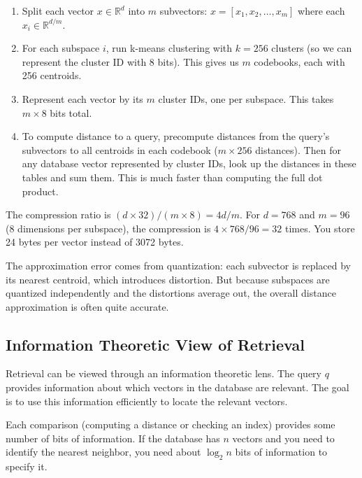 \begin{enumerate}
\item Split each vector $x \in \mathbb{R}^d$ into $m$ subvectors: $x = [x_1, x_2, \ldots, x_m]$ where each $x_i \in \mathbb{R}^{d/m}$.

\item For each subspace $i$, run k-means clustering with $k = 256$ clusters (so we can represent the cluster ID with 8 bits). This gives us $m$ codebooks, each with 256 centroids.

\item Represent each vector by its $m$ cluster IDs, one per subspace. This takes $m \times 8$ bits total.

\item To compute distance to a query, precompute distances from the query's subvectors to all centroids in each codebook ($m \times 256$ distances). Then for any database vector represented by cluster IDs, look up the distances in these tables and sum them. This is much faster than computing the full dot product.
\end{enumerate}

\vspace{1em}

The compression ratio is $(d \times 32) / (m \times 8) = 4d/m$. For $d = 768$ and $m = 96$ (8 dimensions per subspace), the compression is $4 \times 768 / 96 = 32$ times. You store 24 bytes per vector instead of 3072 bytes.

\vspace{1em}

The approximation error comes from quantization: each subvector is replaced by its nearest centroid, which introduces distortion. But because subspaces are quantized independently and the distortions average out, the overall distance approximation is often quite accurate.

\vspace{1.5em}

\subsection{Information Theoretic View of Retrieval}

Retrieval can be viewed through an information theoretic lens. The query $q$ provides information about which vectors in the database are relevant. The goal is to use this information efficiently to locate the relevant vectors.

Each comparison (computing a distance or checking an index) provides some number of bits of information. If the database has $n$ vectors and you need to identify the nearest neighbor, you need about $\log_2 n$ bits of information to specify it.

